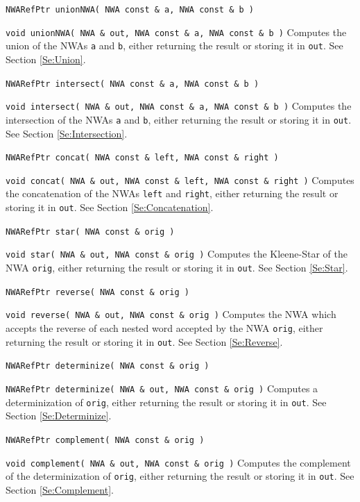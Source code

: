 \begin{description}

  \item\texttt{NWARefPtr unionNWA( NWA const \& a, NWA const \& b )}
  \item\texttt{void unionNWA( NWA \& out, NWA const \& a, NWA const \& b )}
    Computes the union of the NWAs \texttt{a} and \texttt{b},
    either returning the result or storing it in \texttt{out}.
    See Section
    \ref{Se:Union}.

  \item\texttt{NWARefPtr intersect( NWA const \& a, NWA const \& b )}
  \item\texttt{void intersect( NWA \& out, NWA const \& a, NWA const \& b )}
    Computes the intersection of the NWAs \texttt{a} and \texttt{b},
    either returning the result or storing it in \texttt{out}.
    See Section \ref{Se:Intersection}.

  \item\texttt{NWARefPtr concat( NWA const \& left, NWA const \& right )}
  \item\texttt{void concat( NWA \& out, NWA const \& left, NWA const \& right )}
    Computes the concatenation of the NWAs \texttt{left} and
    \texttt{right}, either returning the result or storing it in
    \texttt{out}.
    See Section \ref{Se:Concatenation}.

  \item\texttt{NWARefPtr star( NWA const \& orig )}
  \item\texttt{void star( NWA \& out, NWA const \& orig )}
    Computes the Kleene-Star of the NWA \texttt{orig}, either
    returning the result or storing it in \texttt{out}. See Section
    \ref{Se:Star}.

  \item\texttt{NWARefPtr reverse( NWA const \& orig )}
  \item\texttt{void reverse( NWA \& out, NWA const \& orig )}
    Computes the NWA which accepts the reverse of each nested word
    accepted by the NWA \texttt{orig}, either returning the result or
    storing it in \texttt{out}. See Section \ref{Se:Reverse}.

  \item\texttt{NWARefPtr determinize( NWA const \& orig )}
  \item\texttt{NWARefPtr determinize( NWA \& out, NWA const \& orig )}
    Computes a determinization of \texttt{orig}, either returning the
    result or storing it in \texttt{out}.
    See Section \ref{Se:Determinize}.

  \item\texttt{NWARefPtr complement( NWA const \& orig )}
  \item\texttt{void complement( NWA \& out, NWA const \& orig )}
    Computes the complement of the determinization of \texttt{orig},
    either returning the result or storing it in \texttt{out}.
    See Section
    \ref{Se:Complement}.
\end{description}

